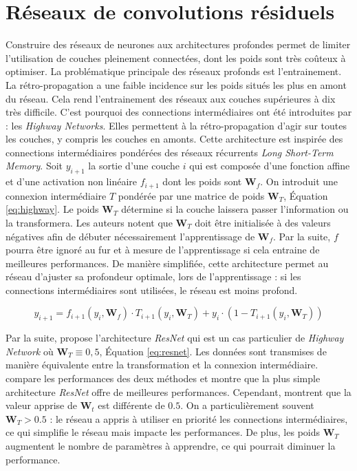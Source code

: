 \section{Réseaux de convolutions résiduels} \label{subsubsec:ResNet}
Construire des réseaux de neurones aux architectures profondes permet de limiter l'utilisation de couches pleinement connectées, dont les poids sont très coûteux à optimiser.
La problématique principale des réseaux profonds est l'entrainement.
La rétro-propagation a une faible incidence sur les poids situés les plus en amont du réseau.
Cela rend l'entrainement des réseaux aux couches supérieures à dix très difficile.
C'est pourquoi des connections intermédiaires ont été introduites par \citeauthor{srivastava_highway_2015} \cite{srivastava_highway_2015, srivastava_training_2015} : les \textit{Highway Networks}.
Elles permettent à la rétro-propagation d'agir sur toutes les couches, y compris les couches en amonts.
Cette architecture est inspirée des connections intermédiaires pondérées des réseaux récurrents \textit{Long Short-Term Memory}.
Soit $y_{i+1}$ la sortie d'une couche $i$ qui est composée d'une fonction affine et d'une activation non linéaire $f_{i+1}$ dont les poids sont $\mathbf{W}_f$.
On introduit une connexion intermédiaire $T$ pondérée par une matrice de poids $\mathbf{W}_T$, Équation \ref{eq:highway}.
Le poids $\mathbf{W}_T$ détermine si la couche laissera passer l'information ou la transformera.
Les auteurs notent que $\mathbf{W}_T$ doit être initialisée à des valeurs négatives afin de débuter nécessairement l'apprentissage de $\mathbf{W}_f$.
Par la suite, $f$ pourra être ignoré au fur et à mesure de l'apprentissage si cela entraine de meilleures performances.
De manière simplifiée, cette architecture permet au réseau d'ajuster sa profondeur optimale, lors de l'apprentissage : si les connections intermédiaires sont utilisées, le réseau est moins profond.

\begin{equation} \label{eq:highway}
y_{i+1} = f_{i+1}\left(y_{i}, \mathbf{W}_f\right) \cdot T_{i+1}\left(y_{i}, \mathbf{W}_{T}\right)+y_{i} \cdot \left(1- T_{i+1}\left(y_{i}, \mathbf{W}_{T}\right)\right)
\end{equation}

Par la suite, \citeauthor{he_deep_2015} \cite{he_deep_2015} propose l'architecture \textit{ResNet} qui est un cas particulier de \textit{Highway Network} où $\mathbf{W}_T \equiv 0,5$, Équation \ref{eq:resnet}.
Les données sont transmises de manière équivalente entre la transformation et la connexion intermédiaire.
\cite{he_identity_2016} compare les performances des deux méthodes et montre que la plus simple architecture \textit{ResNet} offre de meilleures performances.
Cependant, \citeauthor{srivastava_highway_2015} \cite{srivastava_highway_2015} montrent que la valeur apprise de $\mathbf{W}_t$ est différente de $0.5$.
On a particulièrement souvent $\mathbf{W}_T > 0.5$ : le réseau a appris à utiliser en priorité les connections intermédiaires, ce qui simplifie le réseau mais impacte les performances.
De plus, les poids $\mathbf{W}_T$ augmentent le nombre de paramètres à apprendre, ce qui pourrait diminuer la performance.

